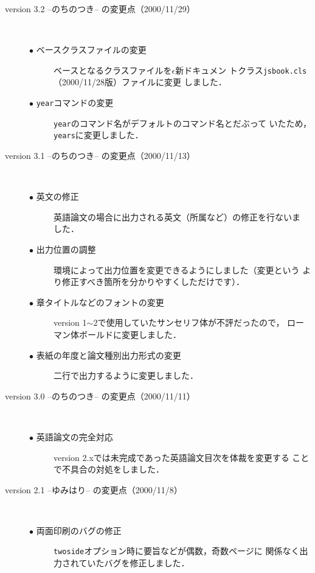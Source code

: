 \documentclass[mingoth]{kut-paper}		%
\begin{document}
\begin{description}
 \item[version 3.2 --のちのつき-- の変更点（2000/11/29）]~
 \begin{description}
  \item[$\bullet$ ベースクラスファイルの変更]
			 ベースとなるクラスファイルを$\epsilon$新ドキュメン
			 トクラス\texttt{jsbook.cls}（2000/11/28版）ファイルに変更
			 しました．
  \item[$\bullet$ \texttt{year}コマンドの変更]
			 \texttt{year}のコマンド名がデフォルトのコマンド名とだぶって
			 いたため，\texttt{years}に変更しました．
 \end{description}
			
 \item[version 3.1 --のちのつき-- の変更点（2000/11/13）]~
 \begin{description}
   \item[$\bullet$ 英文の修正]
			  英語論文の場合に出力される英文（所属など）の修正を行ないま
			  した．
  \item[$\bullet$ 出力位置の調整]
			  環境によって出力位置を変更できるようにしました（変更という
			  より修正すべき箇所を分かりやすくしただけです）．
  \item[$\bullet$ 章タイトルなどのフォントの変更]
			  version 1$\sim$2で使用していたサンセリフ体が不評だったので，
			  ローマン体ボールドに変更しました．
  \item[$\bullet$ 表紙の年度と論文種別出力形式の変更]
			  二行で出力するように変更しました．
 \end{description}
			
 \item[version 3.0 --のちのつき-- の変更点（2000/11/11）]~
 \begin{description}
   \item[$\bullet$ 英語論文の完全対応]
			  version 2.xでは未完成であった英語論文目次を体裁を変更する
			  ことで不具合の対処をしました．
 \end{description}
			
 \item[version 2.1 --ゆみはり-- の変更点（2000/11/8）]~
 \begin{description}
  \item[$\bullet$ 両面印刷のバグの修正]
			 \texttt{twoside}オプション時に要旨などが偶数，奇数ページに
			 関係なく出力されていたバグを修正しました．
 \end{description}
			

\end{description}
\end{document}
